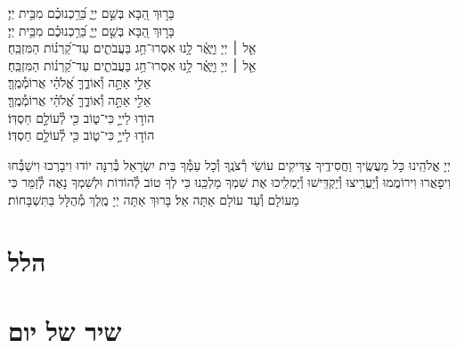 \documentclass[twoside, openany, parskip=half, 11pt]{book}
\begin{document}
{בָּר֣וּךְ הַ֭בָּא בְּשֵׁ֣ם יְיָ֑ בֵּ֝רַ֥כְנוּכֶ֗ם מִבֵּ֥ית יְיָ׃\\
\scriptsize{בָּר֣וּךְ הַ֭בָּא בְּשֵׁ֣ם יְיָ֑ בֵּ֝רַ֥כְנוּכֶ֗ם מִבֵּ֥ית יְיָ׃}\\
\normalsize{אֵ֤ל ׀ יְיָ וַיָּ֢אֶ֫ר לָ֥נוּ אִסְרוּ־חַ֥ג בַּעֲבֹתִ֑ים עַד־קַ֝רְנ֗וֹת הַמִּזְבֵּֽחַ׃}\\
\scriptsize{אֵ֤ל ׀ יְיָ וַיָּ֢אֶ֫ר לָ֥נוּ אִסְרוּ־חַ֥ג בַּעֲבֹתִ֑ים עַד־קַ֝רְנ֗וֹת הַמִּזְבֵּֽחַ׃}\\
\normalsize{אֵלִ֣י אַתָּ֣ה וְ֯אוֹדֶ֑ךָּ אֱ֝לֹהַ֗י אֲרוֹמְ֯מֶֽךָּ׃}\\
\scriptsize{אֵלִ֣י אַתָּ֣ה וְ֯אוֹדֶ֑ךָּ אֱ֝לֹהַ֗י אֲרוֹמְ֯מֶֽךָּ׃}\\
\normalsize{הוֹד֣וּ לַייָ֣ כִּי־ט֑וֹב כִּ֖י לְ֯עוֹלָ֣ם חַסְדּֽוֹ׃ }\\
\scriptsize{הוֹד֣וּ לַייָ֣ כִּי־ט֑וֹב כִּ֖י לְ֯עוֹלָ֣ם חַסְדּֽוֹ׃ } \\
\normalsize{}



\negline

יְיָ אֱלֹהֵֽינוּ כָּל מַעֲשֶֽׂיךָ וַחֲסִידֶֽיךָ צַדִּיקִים עוֹשֵׂי רְ֯צֹנֶֽךָ וְ֯כָל עַמְּ֯ךָ בֵּית יִשְׂרָאֵל בְּ֯רִנָּה יוֹדוּ וִיבָרְכוּ וִישַׁבְּ֯חוּ וִיפָאֲרוּ וִירוֹמֲמוּ וְ֯יַעֲרִֽיצוּ וְ֯יַקְדִּֽישׁוּ וְ֯יַמְלִֽיכוּ אֶת שִׁמְךָ מַלְכֵּֽנוּ כִּי לְךָ טוֹב לְ֯הוֹדוֹת וּלְשִׁמְךָ נָאֶה לְ֯זַמֵּר כִּי מֵעוֹלָם וְ֯עַד עוֹלָם אַתָּה אֵל׃ בָּרוּךְ אַתָּה יְיָ מֶֽלֶךְ מְ֯הֻלָּל בַּתִּשְׁבָּחוֹת׃
}

\label{hallel}
\section[הלל‎]{ הלל‎ }
\hallel{\shatz}


\vfill

\fullkaddish
\section[שיר של יום]{ שיר של יום‎ }
\weekdayshir
\label{shirshabbat}
\end{document}
